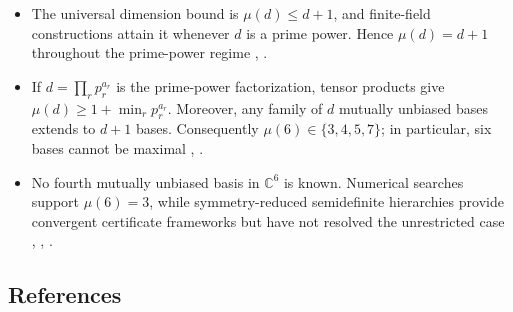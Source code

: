 \begin{itemize}
  \item The universal dimension bound is $\mu(d)\leq d+1$, and finite-field
  constructions attain it whenever $d$ is a prime power.  Hence
  $\mu(d)=d+1$ throughout the prime-power regime
  ,
  .

  \item If $d=\prod_r p_r^{a_r}$ is the prime-power factorization, tensor
  products give $\mu(d)\geq1+\min_r p_r^{a_r}$.  Moreover, any family of $d$
  mutually unbiased bases extends to $d+1$ bases.  Consequently
  $\mu(6)\in\{3,4,5,7\}$; in particular, six bases cannot be maximal
  ,
  .

  \item No fourth mutually unbiased basis in $\mathbb C^6$ is known.
  Numerical searches support $\mu(6)=3$, while symmetry-reduced
  semidefinite hierarchies provide convergent certificate frameworks but have
  not resolved the unrestricted case
  ,
  ,
  .
\end{itemize}

\subsection*{References}

